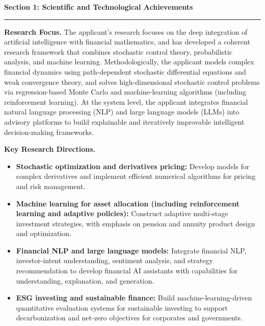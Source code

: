 \documentclass[11pt]{article}
\newcommand{\CVSection}[1]{\vspace{6pt}\textbf{\large #1}\par\vspace{2pt}\hrule\vspace{6pt}}
\newenvironment{tightitemize}{%
  \begin{itemize}[leftmargin=*,nosep,topsep=2pt]
}{\end{itemize}}
\begin{document}


\CVSection{Section 1: Scientific and Technological Achievements}

\textbf{Research Focus.}
The applicant’s research focuses on the deep integration of artificial intelligence with financial mathematics, and has developed a coherent research framework that combines stochastic control theory, probabilistic analysis, and machine learning. Methodologically, the applicant models complex financial dynamics using path-dependent stochastic differential equations and weak convergence theory, and solves high-dimensional stochastic control problems via regression-based Monte Carlo and machine-learning algorithms (including reinforcement learning). At the system level, the applicant integrates financial natural language processing (NLP) and large language models (LLMs) into advisory platforms to build explainable and iteratively improvable intelligent decision-making frameworks.

\textbf{Key Research Directions.}
\begin{tightitemize}
  \item \textbf{Stochastic optimization and derivatives pricing:} Develop models for complex derivatives and implement efficient numerical algorithms for pricing and risk management.
  \item \textbf{Machine learning for asset allocation (including reinforcement learning and adaptive policies):} Construct adaptive multi-stage investment strategies, with emphasis on pension and annuity product design and optimization.
  \item \textbf{Financial NLP and large language models:} Integrate financial NLP, investor-intent understanding, sentiment analysis, and strategy recommendation to develop financial AI assistants with capabilities for understanding, explanation, and generation.
  \item \textbf{ESG investing and sustainable finance:} Build machine-learning-driven quantitative evaluation systems for sustainable investing to support decarbonization and net-zero objectives for corporates and governments.
\end{tightitemize}
\end{document}
